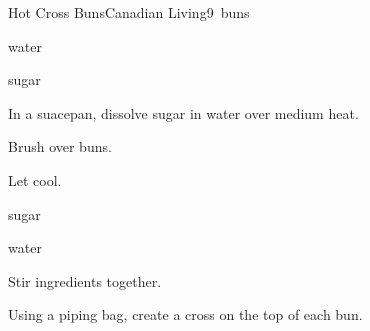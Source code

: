 \begin{recipe}{Hot Cross Buns}{Canadian Living}{9~buns}
\begin{ingredients}
\item {} water
\item {} sugar
\end{ingredients}

\begin{directions}
\item In a suacepan, dissolve sugar in water over medium heat.
\item Brush over buns.
\item Let cool.
\end{directions}

\begin{ingredients}
\item \C{\half} sugar
\item {} water
\end{ingredients}

\begin{directions}
\item Stir ingredients together.
\item Using a piping bag, create a cross on the top of each bun.
\end{directions}

\end{recipe}
